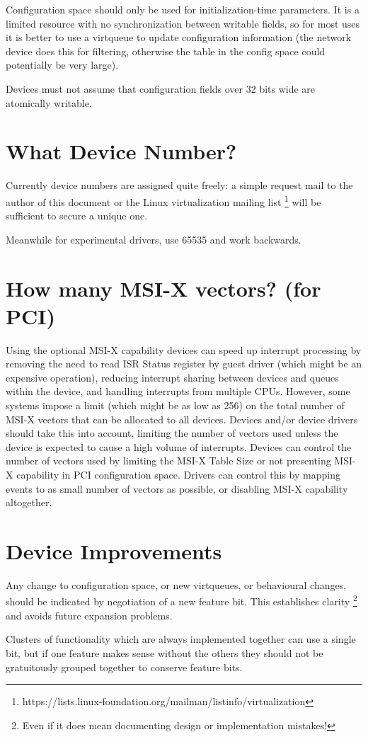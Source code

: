 Configuration space should only be used for initialization-time
parameters.  It is a limited resource with no synchronization between
writable fields, so for most uses it is better to use a virtqueue to update
configuration information (the network device does this for filtering,
otherwise the table in the config space could potentially be very
large).

Devices must not assume that configuration fields over 32 bits wide
are atomically writable.

\section{What Device Number?}\label{sec:Creating New Device Types / What Device Number?}

Currently device numbers are assigned quite freely: a simple
request mail to the author of this document or the Linux
virtualization mailing list
\footnote{https://lists.linux-foundation.org/mailman/listinfo/virtualization
} will be sufficient to secure a unique one.

Meanwhile for experimental drivers, use 65535 and work backwards.

\section{How many MSI-X vectors?  (for PCI)}\label{sec:Creating New Device Types / How many MSI-X vectors?  (for PCI)}

Using the optional MSI-X capability devices can speed up
interrupt processing by removing the need to read ISR Status
register by guest driver (which might be an expensive operation),
reducing interrupt sharing between devices and queues within the
device, and handling interrupts from multiple CPUs. However, some
systems impose a limit (which might be as low as 256) on the
total number of MSI-X vectors that can be allocated to all
devices. Devices and/or device drivers should take this into
account, limiting the number of vectors used unless the device is
expected to cause a high volume of interrupts. Devices can
control the number of vectors used by limiting the MSI-X Table
Size or not presenting MSI-X capability in PCI configuration
space. Drivers can control this by mapping events to as small
number of vectors as possible, or disabling MSI-X capability
altogether.

\section{Device Improvements}\label{sec:Creating New Device Types / Device Improvements}

Any change to configuration space, or new virtqueues, or
behavioural changes, should be indicated by negotiation of a new
feature bit. This establishes clarity
\footnote{Even if it does mean documenting design or implementation
mistakes!
} and avoids future expansion problems.

Clusters of functionality which are always implemented together
can use a single bit, but if one feature makes sense without the
others they should not be gratuitously grouped together to
conserve feature bits.


